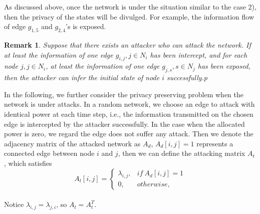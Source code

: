 \documentclass[10pt,journal,compsoc]{IEEEtran}
\newtheorem{remark}{Remark}
\begin{document}
As discussed above, once the network is under the situation similar to the case 2), then the privacy of the states will be divulged. For example, the information flow of edge $g_{1, 5}$ and $g_{2, 4}$'s is exposed.
\begin{remark}\label{exposed condition}
Suppose that there exists an attacker who can attack the network. If at least the information of one edge $g_{i,j}, j\in{N_i}$ has been intercept, and for each node $j, j\in N_i$, at least the information of one edge $g_{j,s}, s\in{N_j}$ has been exposed, then the attacker can infer the initial state of node $i$ successfully.p
\end{remark}
In the following, we further consider the privacy preserving problem when the network is under attacks.  In a random network, we choose an edge to attack with identical power at each time step, i.e., the information transmitted on the chosen edge is intercepted by the attacker successfully. In the case when the allocated power is zero, we regard the edge does not suffer any attack. Then we denote the adjacency matrix of the attacked network as $A_d$, $A_d[i, j]=1$ represents a connected edge between node $i$ and $j$, then we can define the attacking matrix $A_t$, which satisfies
\[
A_t[i, j]=\begin{cases}
\lambda_{i, j}, & if \ A_d[i, j]=1 \\
0, & otherwise,
\end{cases}
\]\\
Notice $\lambda_{i, j}=\lambda_{j, i}$, so $A_t=A_t^T$.
\end{document}
